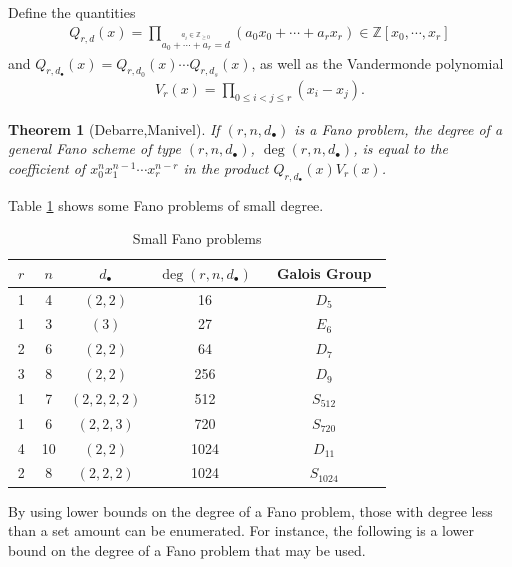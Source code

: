 \documentclass[12pt]{amsart}
\newtheorem{theorem}{Theorem}
\theoremstyle{definition}
\begin{document}
Define the quantities
\begin{align*}
Q_{r,d}(x) = \prod_{\stackrel{a_i\in\mathbb{Z}_{\ge 0}}{a_0+\dotsb+a_r=d}}(a_0x_0 + \dotsb + a_rx_r)\in\mathbb{Z}[x_0,\dotsb,x_r]
\end{align*}
and $Q_{r,d_\bullet}(x) = Q_{r,d_0}(x)\dotsb Q_{r,d_s}(x)$, as well as the Vandermonde polynomial
\begin{align*}
V_r(x) = \prod_{0\le i<j\le r}(x_i-x_j).
\end{align*}

\begin{theorem}[Debarre,Manivel]
If $(r,n,d_\bullet)$ is a Fano problem, the degree of a general Fano scheme of type $(r,n,d_\bullet)$, $\deg(r,n,d_\bullet)$, is equal to the coefficient of $x_0^n x_1^{n-1}\dotsb x_r^{n-r}$ in the product $Q_{r,d_\bullet}(x)V_r(x)$.
\end{theorem}

Table \ref{Small Fano} shows some Fano problems of small degree. 

\begin{table}[htb]
  \caption{Small Fano problems}
  \label{Small Fano}
  \def\arraystretch{1.2}
  \begin{tabular}{||c|c|c|c|c||}
    \hline
    $~r~$ & $~n~$ & $~d_\bullet~$ & $~\deg(r,n,d_\bullet)~$ & ~Galois Group~\\
    \hline\hline
    1 & 4 & $(2,2)$ & 16 & $D_5$\\
    \hline
    1 & 3 & $(3)$ & 27 & $E_6$\\
    \hline
    2 & 6 & $(2,2)$ & 64 & $D_7$\\
    \hline
    3 & 8 & $(2,2)$ & 256 & $D_9$\\
    \hline
    1 & 7 & $(2,2,2,2)$ & 512 & $S_{512}$\\
    \hline
    1 & 6 & $(2,2,3)$ & 720  & $S_{720}$\\
    \hline
    4 & 10 & $(2,2)$ & 1024 & $D_{11}$\\
    \hline
    2 & 8 & $(2,2,2)$ & 1024  & $S_{1024}$\\
    \hline
  \end{tabular}
\end{table}

By using lower bounds on the degree of a Fano problem, those with degree less than a set amount can be enumerated. For instance, the following is a lower bound on the degree of a Fano problem that may be used.
\end{document}
